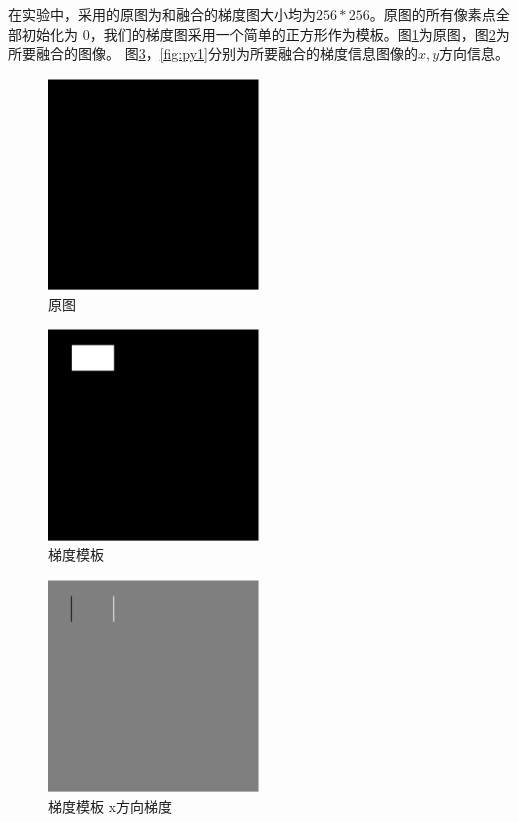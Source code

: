 在实验中，采用的原图为和融合的梯度图大小均为$256*256$。原图的所有像素点全部初始化为
$0$，我们的梯度图采用一个简单的正方形作为模板。图\ref{fig:I1}为原图，图\ref{fig:p1}为所要融合的图像。
图\ref{fig:px1}，\ref{fig:py1}分别为所要融合的梯度信息图像的$x,y$方向信息。
\begin{figure}[h!]
\center
\includegraphics[width=0.5\textwidth]{figure/gradtest/I1}
\caption{原图}\label{fig:I1}
\end{figure}
\begin{figure}[h!]
\center
\includegraphics[width=0.5\textwidth]{figure/gradtest/p1}
\caption{梯度模板}\label{fig:p1}
\end{figure}
\begin{figure}[h!]
\center
\includegraphics[width=0.5\textwidth]{figure/gradtest/px1}
\caption{梯度模板 x方向梯度}\label{fig:px1}
\end{figure}
